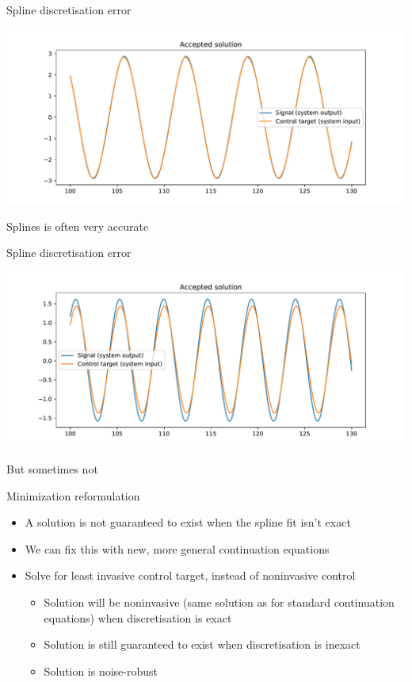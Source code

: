 \documentclass[presentation]{beamer}
\begin{document}
\begin{frame}[label={sec:org561a04d}]{Spline discretisation error}
\begin{center}
\includegraphics[width=.9\linewidth]{./good_solution.pdf}
\end{center}   

Splines is often very accurate
\end{frame}

\begin{frame}[label={sec:orgff52521}]{Spline discretisation error}
\begin{center}
\includegraphics[width=.9\linewidth]{./bad_solution.pdf}
\end{center}

But sometimes not
\end{frame}


\begin{frame}[label={sec:orgf862f51}]{Minimization reformulation}
\begin{itemize}
\item A solution is not guaranteed to exist when the spline fit isn't exact
\end{itemize}
\vfill
\begin{itemize}
\item We can fix this with new, more general continuation equations
\end{itemize}
\vfill
\begin{itemize}
\item Solve for least invasive control target, instead of noninvasive control
\begin{itemize}
\item Solution will be noninvasive (same solution as for standard continuation equations) when discretisation is exact
\item Solution is still guaranteed to exist when discretisation is inexact
\item Solution is noise-robust
\end{itemize}
\end{itemize}
\end{frame}
\end{document}
